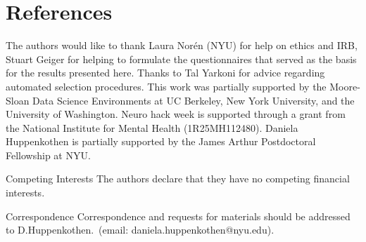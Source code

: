 \documentclass{nature}
\begin{document}



\section{References}





\begin{addendum}
 \item{The authors would like to thank Laura Nor\'{e}n (NYU) for help on ethics and IRB, Stuart Geiger for helping to formulate the questionnaires that served as the basis for the results presented here. Thanks to Tal Yarkoni for advice regarding automated selection procedures. This work was partially supported by the Moore-Sloan Data Science Environments at UC Berkeley, New York University, and the University of Washington. Neuro hack week is supported through a grant from the National Institute for Mental Health (1R25MH112480). Daniela Huppenkothen is partially supported by the James Arthur Postdoctoral Fellowship at NYU.}
 \item[Competing Interests]{The authors declare that they have no competing financial interests.}
 \item[Correspondence]{Correspondence and requests for materials should be addressed to D.Huppenkothen.~(email: daniela.huppenkothen@nyu.edu).}
\end{addendum}


\end{document}
